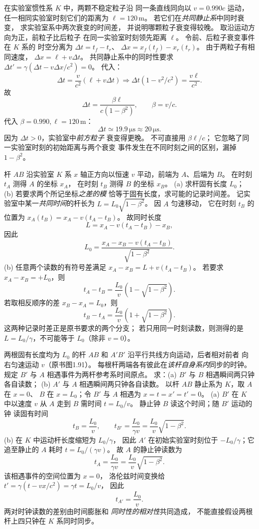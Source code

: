 在实验室惯性系 $K$ 中，两颗不稳定粒子沿
同一条直线同向以 $v=0.990c$ 运动，
任一相同实验室时刻它们的距离为 $\ell=120\,\mathrm m$。
若它们在\emph{共同静止系}中同时衰变，
求实验室系中两次衰变的时间差，
并说明哪颗粒子衰变得较晚。
\exsolution
取沿运动方向为正，前粒子比后粒子
在同一实验室时刻领先距离 $\ell$。
令前、后粒子衰变事件在 $K$ 系的
时空分离为 $\Delta t=t_f-t_r$、
$\Delta x=x_f(t_f)-x_r(t_r)$。
由于两粒子有相同速度，
$\Delta x=\ell+v\Delta t$。
共同静止系中的同时性要求
$\Delta t'=\gamma(\Delta t-v\Delta x/c^2)=0$。
代入：
\[
\Delta t=\frac v{c^2}(\ell+v\Delta t)
\Longrightarrow
\Delta t(1-v^2/c^2)=\frac{v\ell}{c^2}.
\]
故
\[
\boxed{\Delta t=\frac{\beta\ell}{c(1-\beta^2)}}
,\qquad\beta=v/c.
\]
代入 $\beta=0.990,\ell=120\,\mathrm m$：
\[
\boxed{\Delta t\simeq19.9\,\mathrm{\mu s}
\approx20\,\mathrm{\mu s}}.
\]
因为 $\Delta t>0$，实验室中\emph{前方粒子}
衰变得更晚。
\excheck 不可直接用 $\beta\ell/c$；
它忽略了同一实验室时刻的初始距离与两个衰变
事件发生在不同时刻之间的区别，漏掉 $1-\beta^2$。

杆 $AB$ 沿实验室 $K$ 系 $x$ 轴正方向以恒速 $v$
平动，前端为 $A$、后端为 $B$。
在时刻 $t_A$ 测得 $A$ 的坐标 $x_A$，
在时刻 $t_B$ 测得 $B$ 的坐标 $x_B$。
(a) 求杆固有长度 $L_0$；
(b) 若要求两个所记坐标\emph{之差的模}
恰等于固有长度，求可能的记录时间差。
\exsolution
记实验室中某一\emph{共同时间}的杆长为
$L=L_0\sqrt{1-\beta^2}$。
因 $A$ 匀速移动，
它在时刻 $t_B$ 的位置为
$x_A(t_B)=x_A-v(t_A-t_B)$。
故同时长度
\[
L=x_A-v(t_A-t_B)-x_B,
\]
因此
\[
\boxed{L_0=
\frac{x_A-x_B-v(t_A-t_B)}{\sqrt{1-\beta^2}}}.
\]
(b) 任意两个读数的有符号差满足
$x_A-x_B=L+v(t_A-t_B)$。
若要求 $x_A-x_B=+L_0$，则
\[
\boxed{t_A-t_B=\frac{L_0}{v}
\left(1-\sqrt{1-\beta^2}\right)}.
\]
若取相反顺序的差
$x_B-x_A=L_0$，则
\[
\boxed{t_B-t_A=\frac{L_0}{v}
\left(1+\sqrt{1-\beta^2}\right)}.
\]
\excheck 这两种记录时差正是原书要求的两个分支；
若只用同一时刻读数，则测得的是
$L=L_0/\gamma$，不可能等于 $L_0$（除非 $v=0$）。

两根固有长度均为 $L_0$ 的杆 $AB$
和 $A'B'$ 沿平行共线方向运动，后者相对前者
向右匀速运动 $v$（原书图1.91）。
每根杆两端各有彼此在\emph{该杆自身系内}同步的时钟。
规定 $B'$ 与 $A$ 相遇事件为两杆参考系时间原点。
求：(a) $B'$ 与 $B$ 相遇瞬间两只钟各自读数；
(b) $A'$ 与 $A$ 相遇瞬间两只钟各自读数。
\exsolution
以杆 $AB$ 静止系为 $K$，取 $A$ 在 $x=0$、
$B$ 在 $x=L_0$；令 $B'$ 与 $A$ 相遇为
$x=t=x'=t'=0$。
(a) $B'$ 在 $K$ 中以速度 $v$ 从 $A$ 走到 $B$
需时间 $t=L_0/v$。
静止钟 $B$ 读这个时间；随 $B'$ 运动的钟
读固有时间
\[
\boxed{t_B=\frac{L_0}{v}},\qquad
\boxed{t_{B'}=\frac{L_0}{\gamma v}
=\frac{L_0}{v}\sqrt{1-\beta^2}}.
\]
(b) 在 $K$ 中运动杆长度缩短为 $L_0/\gamma$，
因此 $A'$ 在初始实验室时刻位于
$-L_0/\gamma$；它追至静止的 $A$ 耗时
$t=L_0/(\gamma v)$。
故 $A$ 的静止钟读数为
\[
\boxed{t_A=\frac{L_0}{\gamma v}
=\frac{L_0}{v}\sqrt{1-\beta^2}}.
\]
该相遇事件的空间位置为 $x=0$，
洛伦兹时间变换给
$t'=\gamma(t-vx/c^2)=\gamma t=L_0/v$，
因此
\[
\boxed{t_{A'}=\frac{L_0}{v}}.
\]
\excheck 两对时钟读数的差别由时间膨胀和
\emph{同时性的相对性}共同造成，
不能直接假设两根杆上四只钟在 $K$ 系同时同步。

